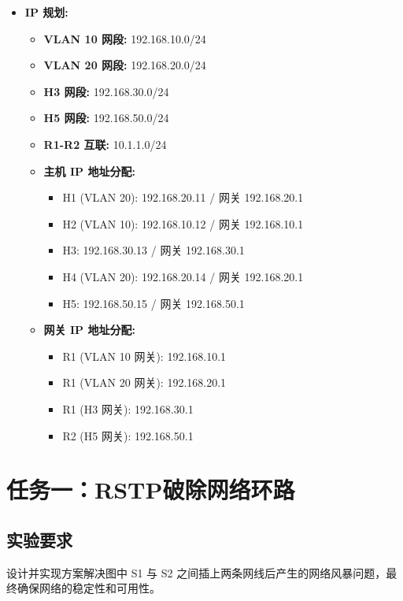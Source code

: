 \documentclass[12pt, a4paper]{article}
\begin{document}
\begin{itemize}
    \item \textbf{IP 规划:}
    \begin{itemize}
        \item \textbf{VLAN 10 网段:} 192.168.10.0/24
        \item \textbf{VLAN 20 网段:} 192.168.20.0/24
        \item \textbf{H3 网段:} 192.168.30.0/24
        \item \textbf{H5 网段:} 192.168.50.0/24
        \item \textbf{R1-R2 互联:} 10.1.1.0/24
        \item \textbf{主机 IP 地址分配:}
        \begin{itemize}
            \item H1 (VLAN 20): 192.168.20.11 / 网关 192.168.20.1
            \item H2 (VLAN 10): 192.168.10.12 / 网关 192.168.10.1
            \item H3: 192.168.30.13 / 网关 192.168.30.1
            \item H4 (VLAN 20): 192.168.20.14 / 网关 192.168.20.1
            \item H5: 192.168.50.15 / 网关 192.168.50.1
        \end{itemize}
        \item \textbf{网关 IP 地址分配:}
        \begin{itemize}
            \item R1 (VLAN 10 网关): 192.168.10.1
            \item R1 (VLAN 20 网关): 192.168.20.1
            \item R1 (H3 网关): 192.168.30.1
            \item R2 (H5 网关): 192.168.50.1
        \end{itemize}
    \end{itemize}
\end{itemize}

\newpage
\section{任务一：RSTP破除网络环路}

\subsection{实验要求}

设计并实现方案解决图中 S1 与 S2 之间插上两条网线后产生的网络风暴问题，最终确保网络的稳定性和可用性。
\end{document}
